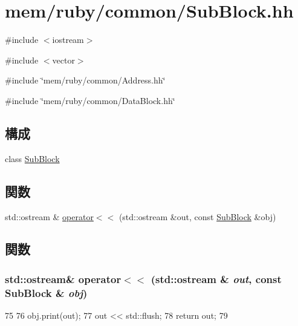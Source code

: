 \hypertarget{SubBlock_8hh}{
\section{mem/ruby/common/SubBlock.hh}
\label{SubBlock_8hh}
}
{\ttfamily \#include $<$iostream$>$}\par
{\ttfamily \#include $<$vector$>$}\par
{\ttfamily \#include \char`\"{}mem/ruby/common/Address.hh\char`\"{}}\par
{\ttfamily \#include \char`\"{}mem/ruby/common/DataBlock.hh\char`\"{}}\par
\subsection*{構成}
\begin{DoxyCompactItemize}
\item 
class \hyperlink{classSubBlock}{SubBlock}
\end{DoxyCompactItemize}
\subsection*{関数}
\begin{DoxyCompactItemize}
\item 
std::ostream \& \hyperlink{SubBlock_8hh_a1b9d933a5a45806594652399d8fa433e}{operator$<$$<$} (std::ostream \&out, const \hyperlink{classSubBlock}{SubBlock} \&obj)
\end{DoxyCompactItemize}


\subsection{関数}
\hypertarget{SubBlock_8hh_a1b9d933a5a45806594652399d8fa433e}{
\subsubsection[{operator$<$$<$}]{\setlength{\rightskip}{0pt plus 5cm}std::ostream\& operator$<$$<$ (std::ostream \& {\em out}, \/  const {\bf SubBlock} \& {\em obj})}}
\label{SubBlock_8hh_a1b9d933a5a45806594652399d8fa433e}



\begin{DoxyCode}
75 {
76     obj.print(out);
77     out << std::flush;
78     return out;
79 }
\end{DoxyCode}
